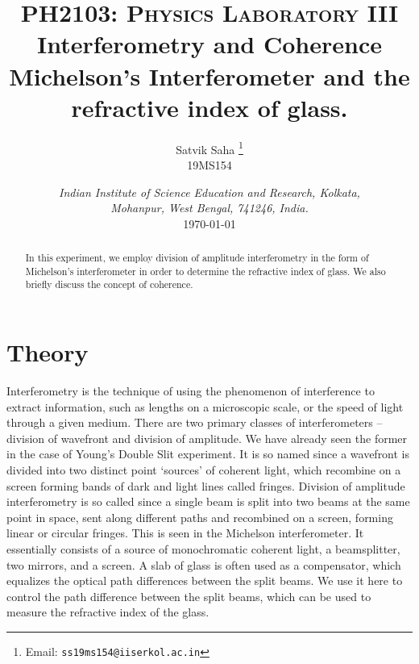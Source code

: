 \documentclass[11pt]{article}
\title{
        \Large\textsc{PH2103: Physics Laboratory III} \\
        \vspace{10pt}
        \Huge \textbf{Interferometry and Coherence} \\
        \vspace{5pt}
        \large{Michelson's Interferometer and the refractive index of glass.}
}
\author{
        \large Satvik Saha%
        \thanks{Email: \tt ss19ms154@iiserkol.ac.in}
        \\\textsc{\small 19MS154}
}
\date{\normalsize
        \textit{Indian Institute of Science Education and Research, Kolkata, \\
        Mohanpur, West Bengal, 741246, India.} \\
        \vspace{10pt}
        \today
}
\begin{document}
        \maketitle

        \begin{abstract}
                In this experiment, we employ division of amplitude interferometry in the form of Michelson's interferometer in order to
                determine the refractive index of glass.
                We also briefly discuss the concept of coherence.
        \end{abstract}

        \section{Theory}

        Interferometry is the technique of using the phenomenon of interference to extract information, such as lengths on a microscopic scale,
        or the speed of light through a given medium. There are two primary classes of interferometers -- division of wavefront and division
        of amplitude. We have already seen the former in the case of Young's Double Slit experiment. It is so named since a 
        wavefront is divided into two distinct point `sources' of coherent light, which recombine on a screen forming bands of dark and light
        lines called fringes. Division of amplitude interferometry is so called since a single beam is split into two beams at the same point in space,
        sent along different paths and recombined on a screen, forming linear or circular fringes. This is seen in the Michelson interferometer.
        It essentially consists of a source of monochromatic coherent light, a beamsplitter, two mirrors, and a screen. A slab of glass is
        often used as a compensator, which equalizes the optical path differences between the split beams.
        We use it here to control the path difference between the split beams, which can be used to measure the refractive index of the glass.
\end{document}
